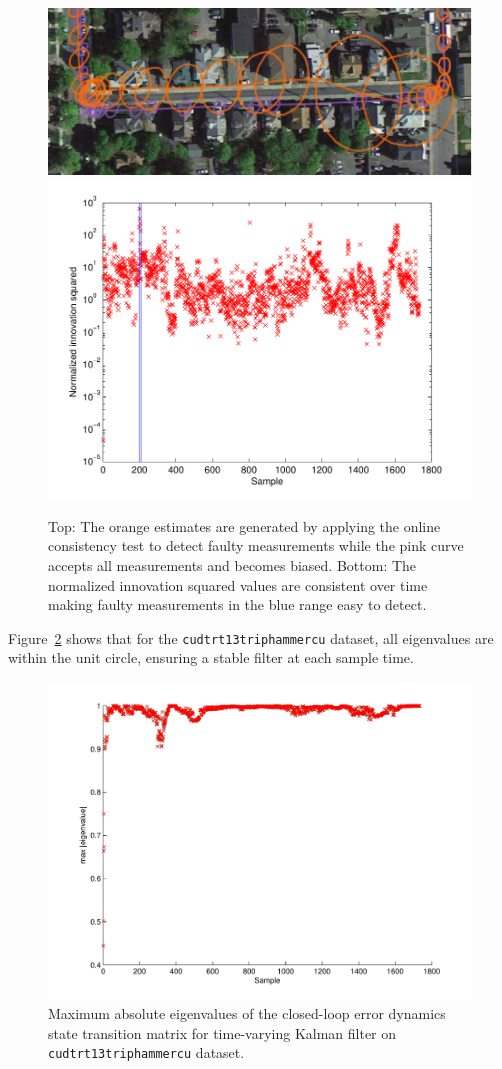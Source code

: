 \begin{figure}
\includegraphics[width=\columnwidth]{cu_corruption}\\
\includegraphics[width=\columnwidth]{nis_cu_corruption}
\caption{Top: The orange estimates are generated by applying the online consistency test to detect faulty measurements while the pink curve accepts all measurements and becomes biased.  Bottom: The normalized innovation squared values are consistent over time making faulty measurements in the blue range easy to detect.}
\label{fig:cu_corruption}
\end{figure}

Figure~\ref{fig:max_eigenvalue} shows that for the \texttt{cudtrt13triphammercu} dataset, all eigenvalues are within the unit circle, ensuring a stable filter at each sample time.

\begin{figure}[!t]
\includegraphics[width=\columnwidth]{eigenvalues}
\caption{Maximum absolute eigenvalues of the closed-loop error dynamics state transition matrix for time-varying Kalman filter on \texttt{cudtrt13triphammercu} dataset.}
\label{fig:max_eigenvalue}
\end{figure}

